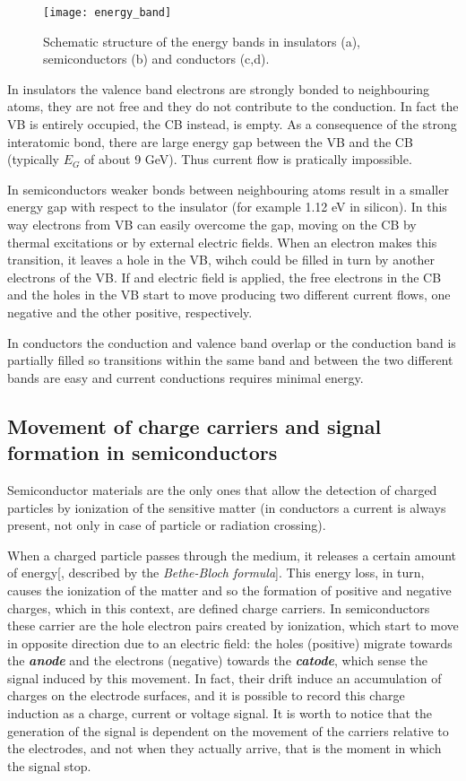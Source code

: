 \begin{figure}[h!]
\centering
\texttt{[image: energy\_band]}
\caption{Schematic structure of the energy bands in insulators (a), semiconductors (b) and conductors (c,d).}
\label{fig:energy_band}
\end{figure}


In insulators the valence band electrons are strongly bonded to neighbouring atoms, they are not free and they do not contribute to the conduction. In fact the VB is entirely occupied, the CB instead, is empty. As a consequence of the strong interatomic bond, there are large energy gap between the VB and the CB (typically $E_{G}$ of about 9 GeV). Thus current flow is pratically impossible. 

In semiconductors weaker bonds between neighbouring atoms result in a smaller energy gap with respect to the insulator (for example 1.12 eV in silicon). In this way electrons from VB can easily overcome the gap, moving on the CB by thermal excitations or by external electric fields. When an electron makes this transition, it leaves a hole in the VB, wihch could be filled in turn by another electrons of the VB. If and electric field is applied, the free electrons in the CB and the holes in the VB start to move producing two different current flows, one negative and the other positive, respectively.

In conductors the conduction and valence band overlap or the conduction band is partially filled so transitions within the same band and between the two different bands are easy and current conductions requires minimal energy.


\subsection{Movement of charge carriers and signal formation in semiconductors}

Semiconductor materials are the only ones that allow the detection of charged particles by ionization of the sensitive matter (in conductors a current is always present, not only in case of particle or radiation crossing). 

When a charged particle passes through the medium, it releases a certain amount of energy[, described by the \textit{Bethe-Bloch formula}]. This energy loss, in turn, causes the ionization of the matter and so the formation of positive and negative charges, which in this context, are defined charge carriers. In semiconductors these carrier are the hole electron pairs created by ionization, which  start to move in opposite direction due to an electric field: the holes (positive) migrate towards the \textit{\textbf{anode}} and the electrons (negative) towards the \textit{\textbf{catode}}, which sense the signal induced by this movement. In fact, their drift induce an accumulation of charges on the electrode surfaces, and it is possible to record this charge induction as a charge, current or voltage signal. It is worth to notice that the generation of the signal is dependent on the movement of the carriers relative to the electrodes, and not when they actually arrive, that is the moment in which the signal stop.\\

